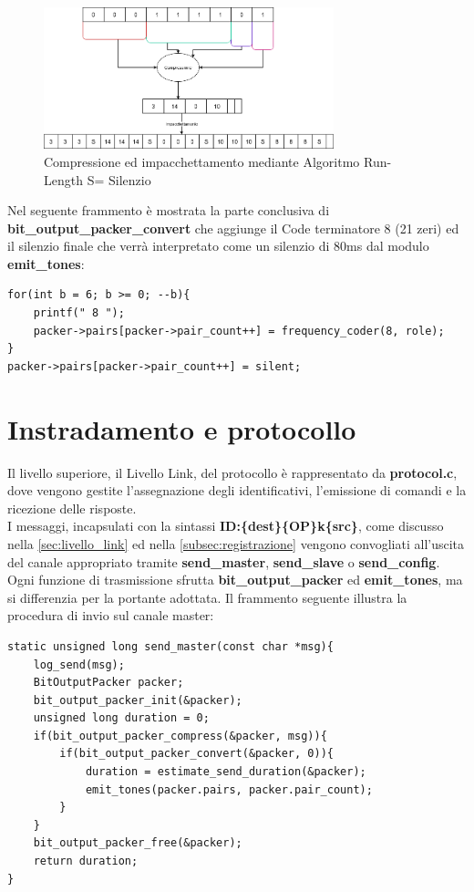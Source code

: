   \begin{figure}[H]
    \centering
    \includegraphics[width=0.75\textwidth]{immagini/run_length.png}
    \caption{Compressione ed impacchettamento mediante Algoritmo Run-Length S= Silenzio}
    \label{fig:run_length}
\end{figure}

   Nel seguente frammento  è mostrata la parte conclusiva di \textbf{bit\_output\_packer\_convert} che aggiunge il Code terminatore 8 (21 zeri) 
  ed il silenzio finale che verrà interpretato come un silenzio di 80ms dal modulo \textbf{emit\_tones}:

\begin{verbatim}
for(int b = 6; b >= 0; --b){
    printf(" 8 ");
    packer->pairs[packer->pair_count++] = frequency_coder(8, role);
}
packer->pairs[packer->pair_count++] = silent;
\end{verbatim}

\section{Instradamento e protocollo}

Il livello superiore, il Livello Link, del protocollo è rappresentato da \textbf{protocol.c}, dove vengono gestite l’assegnazione degli identificativi, 
l’emissione di comandi e la ricezione delle risposte. \\
I messaggi, incapsulati con la sintassi \textbf{ID:\{dest\}\{OP\}k\{src\}}, come discusso nella \autoref{sec:livello_link} ed nella \autoref{subsec:registrazione}
 vengono convogliati 
all’uscita del canale appropriato tramite \textbf{send\_master}, \textbf{send\_slave} o \textbf{send\_config}.\\
 Ogni funzione di trasmissione sfrutta 
\textbf{bit\_output\_packer} ed \textbf{emit\_tones}, ma si differenzia per la portante adottata. Il frammento seguente illustra la procedura di invio
 sul canale master:

\begin{verbatim}
static unsigned long send_master(const char *msg){
    log_send(msg);
    BitOutputPacker packer;
    bit_output_packer_init(&packer);
    unsigned long duration = 0;
    if(bit_output_packer_compress(&packer, msg)){
        if(bit_output_packer_convert(&packer, 0)){
            duration = estimate_send_duration(&packer);
            emit_tones(packer.pairs, packer.pair_count);
        }
    }
    bit_output_packer_free(&packer);
    return duration;
}
\end{verbatim}

